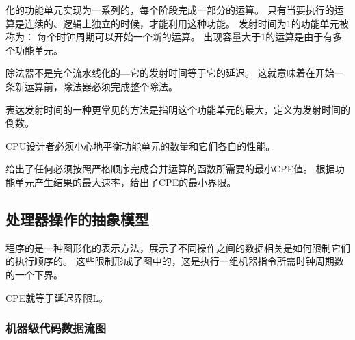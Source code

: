 {{        化的功能单元实现为一系列的，每个阶段完成一部分的运算。
        只有当要执行的运算是连续的、逻辑上独立的时候，才能利用这种功能。
        发射时间为1的功能单元被称为：
        每个时钟周期可以开始一个新的运算。
        出现容量大于1的运算是由于有多个功能单元。

        除法器不是完全流水线化的---它的发射时间等于它的延迟。
        这就意味着在开始一条新运算前，除法器必须完成整个除法。

        表达发射时间的一种更常见的方法是指明这个功能单元的最大，定义为发射时间的倒数。

        CPU设计者必须小心地平衡功能单元的数量和它们各自的性能。

        给出了任何必须按照严格顺序完成合并运算的函数所需要的最小CPE值。
        根据功能单元产生结果的最大速率，给出了CPE的最小界限。
    }

    \subsection{处理器操作的抽象模型}
    {
        程序的是一种图形化的表示方法，展示了不同操作之间的数据相关是如何限制它们的执行顺序的。
        这些限制形成了图中的，这是执行一组机器指令所需时钟周期数的一个下界。

        CPE就等于延迟界限L。

        \subsubsection{机器级代码数据流图}
        {

        }
    }
}
